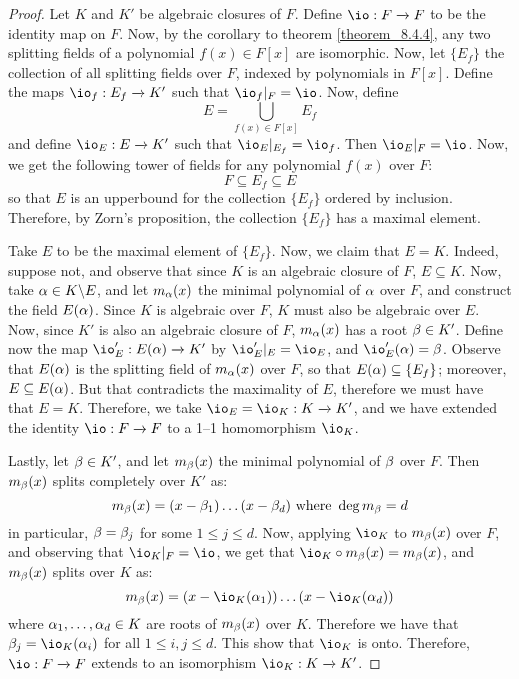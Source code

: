 \begin{proof}
  Let $K$ and $K'$ be algebraic closures of $F$. Define $\io:F
  \xrightarrow{} F$ to be the identity map on $F$. Now, by the
  corollary to theorem \ref{theorem_8.4.4}, any two splitting fields
  of a polynomial $f(x) \in F[x]$ are isomorphic. Now, let $\{E_f\}$
  the collection of all splitting fields over $F$, indexed by
  polynomials in $F[x]$. Define the maps $\io_f:E_f \xrightarrow{} K'$
  such that $\io_f|_F=\io$. Now, define
  \begin{equation*}
    E=\bigcup_{f(x) \in F[x]}{E_f}
  \end{equation*}
  and define $\io_E:E \xrightarrow{} K'$ such that
  $\io_E|_{E_f}=\io_f$. Then $\io_E|_F=\io$. Now, we get the following
  tower of fields for any polynomial $f(x)$ over $F$:
  \begin{equation*}
    F \subseteq E_f \subseteq E
  \end{equation*}
  so that $E$ is an upperbound for the collection $\{E_f\}$ ordered by
  inclusion. Therefore, by Zorn's proposition, the collection $\{E_f\}$ has
  a maximal element.

  Take $E$ to be the maximal element of $\{E_f\}$. Now, we claim that
  $E=K$. Indeed, suppose not, and observe that since $K$ is an
  algebraic closure of $F$, $E \subseteq K$. Now, take $\alpha \in
  K \backslash E$, and let $m_\alpha(x)$ the minimal polynomial of $\alpha$ over
  $F$, and construct the field $E(\alpha)$. Since $K$ is algebraic over
  $F$, $K$ must also be algebraic over $E$. Now, since $K'$ is also an
  algebraic closure of $F$, $m_\alpha(x)$ has a root $\beta \in K'$. Define
  now the map $\io_E':E(\a) \xrightarrow{} K'$ by $\io_E'|_E=\io_E$,
  and $\io_E'(\a)=\b$. Observe that $E(\alpha)$ is the splitting field of
  $m_\alpha(x)$ over $F$, so that $E(\alpha) \subseteq \{E_f\}$; moreover, $E
  \subseteq E(\alpha)$. But that contradicts the maximality of $E$,
  therefore we must have that $E=K$. Therefore, we take
  $\io_E=\io_K:K \xrightarrow{} K'$, and we have extended the
  identity $\io:F \xrightarrow{} F$ to a 1--1 homomorphism $\io_K$.

  Lastly, let $\beta \in K'$, and let $m_\beta(x)$ the minimal polynomial of
  $\beta$ over $F$. Then $m_\beta(x)$ splits completely over $K'$ as:
  \begin{equation*}
    m_\beta(x)=(x-\beta_1) \dots (x-\beta_d) \text{ where } \deg{m_\beta}=d
  \end{equation*}
  in particular, $\beta=\beta_j$ for some $1 \leq j \leq d$. Now, applying
  $\io_K$ to $m_\beta(x)$ over $F$, and observing that $\io_K|_F=\io$, we
  get that $\io_K \circ m_\b(x)=m_\b(x)$, and $m_\beta(x)$ splits over
  $K$ as:
  \begin{equation*}
    m_\b(x)=(x-\io_K(\a_1)) \dots (x-\io_K(\a_d))
  \end{equation*}
  where $\alpha_1, \dots, \alpha_d \in K$ are roots of $m_\beta(x)$ over $K$.
  Therefore we have that $\b_j=\io_K(\a_i)$ for all $1 \leq i,j \leq
  d$. This show that $\io_K$ is onto. Therefore, $\io:F \xrightarrow{}
  F$ extends to an isomorphism $\io_K:K \xrightarrow{} K'$.
\end{proof}

